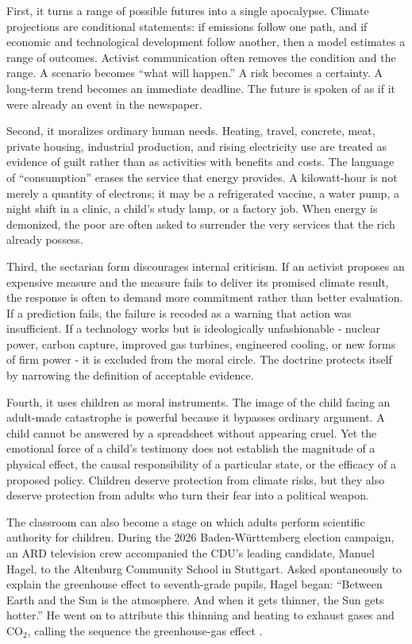 ﻿\documentclass[12pt,a4paper]{book}
\begin{document}
First, it turns a range of possible futures into a single apocalypse. Climate projections are conditional statements: if emissions follow one path, and if economic and technological development follow another, then a model estimates a range of outcomes. Activist communication often removes the condition and the range. A scenario becomes ``what will happen.'' A risk becomes a certainty. A long-term trend becomes an immediate deadline. The future is spoken of as if it were already an event in the newspaper.

Second, it moralizes ordinary human needs. Heating, travel, concrete, meat, private housing, industrial production, and rising electricity use are treated as evidence of guilt rather than as activities with benefits and costs. The language of ``consumption'' erases the service that energy provides. A kilowatt-hour is not merely a quantity of electrons; it may be a refrigerated vaccine, a water pump, a night shift in a clinic, a child's study lamp, or a factory job. When energy is demonized, the poor are often asked to surrender the very services that the rich already possess.

Third, the sectarian form discourages internal criticism. If an activist proposes an expensive measure and the measure fails to deliver its promised climate result, the response is often to demand more commitment rather than better evaluation. If a prediction fails, the failure is recoded as a warning that action was insufficient. If a technology works but is ideologically unfashionable - nuclear power, carbon capture, improved gas turbines, engineered cooling, or new forms of firm power - it is excluded from the moral circle. The doctrine protects itself by narrowing the definition of acceptable evidence.

Fourth, it uses children as moral instruments. The image of the child facing an adult-made catastrophe is powerful because it bypasses ordinary argument. A child cannot be answered by a spreadsheet without appearing cruel. Yet the emotional force of a child's testimony does not establish the magnitude of a physical effect, the causal responsibility of a particular state, or the efficacy of a proposed policy. Children deserve protection from climate risks, but they also deserve protection from adults who turn their fear into a political weapon.

The classroom can also become a stage on which adults perform scientific
authority for children.  During the 2026 Baden-W\"urttemberg election campaign,
an ARD television crew accompanied the CDU's leading candidate, Manuel Hagel,
to the Altenburg Community School in Stuttgart.  Asked spontaneously to explain
the greenhouse effect to seventh-grade pupils, Hagel began: ``Between Earth and
the Sun is the atmosphere.  And when it gets thinner, the Sun gets hotter.''
He went on to attribute this thinning and heating to exhaust gases and
CO$_2$, calling the sequence the greenhouse-gas effect
\cite{NebelHagelClassroom2026}.
\end{document}
